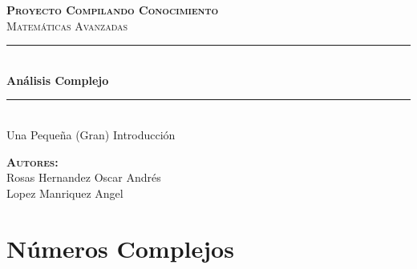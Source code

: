 \documentclass[12pt, fleqn]{report}                             %
\author{Oscar Andrés Rosas}                                     %
\begin{document}
\begin{titlepage}

    \center
    \textbf{\textsc{\Large Proyecto Compilando Conocimiento}}\\[1.0cm] 
    \textsc{\Large Matemáticas Avanzadas}\\[1.0cm] 

    \rule{\linewidth}{0.5mm} \\[1.0cm]
        { \huge \bfseries Análisis Complejo}\\[1.0cm] 
    \rule{\linewidth}{0.5mm} \\[2.0cm]
    
    {\LARGE Una Pequeña (Gran) Introducción}\\[7cm] 
    
    \begin{center} \large
    \textbf{\textsc{Autores:}}\\
    Rosas Hernandez Oscar Andrés \\
    Lopez Manriquez Angel
    \end{center}

    \vfill

\end{titlepage}

\tableofcontents{}
\label{sec:Index}

\clearpage




\part{Números Complejos}
\clearpage


\end{document}

